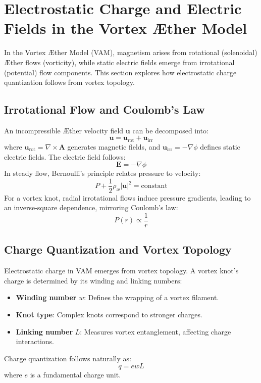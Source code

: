 

\section{Electrostatic Charge and Electric Fields in the Vortex Æther Model}


In the Vortex Æther Model (VAM), magnetism arises from rotational (solenoidal) Æther flows (vorticity), while static electric fields emerge from irrotational (potential) flow components. This section explores how electrostatic charge quantization follows from vortex topology.


\subsection{Irrotational Flow and Coulomb's Law}


An incompressible Æther velocity field $\mathbf{u}$ can be decomposed into:
\begin{equation}
    \mathbf{u} = \mathbf{u}_{\mathrm{rot}} + \mathbf{u}_{\mathrm{irr}}
\end{equation}
where $\mathbf{u}_{\mathrm{rot}} = \nabla \times \mathbf{A}$ generates magnetic fields, and $\mathbf{u}_{\mathrm{irr}} = -\nabla \phi$ defines static electric fields. The electric field follows:
\begin{equation}
    \mathbf{E} = -\nabla \phi
\end{equation}
In steady flow, Bernoulli's principle relates pressure to velocity:
\begin{equation}
    P + \frac{1}{2}\rho_\text{\ae} |\mathbf{u}|^2 = \text{constant}
\end{equation}
For a vortex knot, radial irrotational flows induce pressure gradients, leading to an inverse-square dependence, mirroring Coulomb's law:
\begin{equation}
    P(r) \propto \frac{1}{r}
\end{equation}


\subsection{Charge Quantization and Vortex Topology}


Electrostatic charge in VAM emerges from vortex topology. A vortex knot's charge is determined by its winding and linking numbers:
\begin{itemize}
    \item \textbf{Winding number} $w$: Defines the wrapping of a vortex filament.
    \item \textbf{Knot type}: Complex knots correspond to stronger charges.
    \item \textbf{Linking number} $L$: Measures vortex entanglement, affecting charge interactions.
\end{itemize}
Charge quantization follows naturally as:
\begin{equation}
    q = e w L
\end{equation}
where $e$ is a fundamental charge unit.


